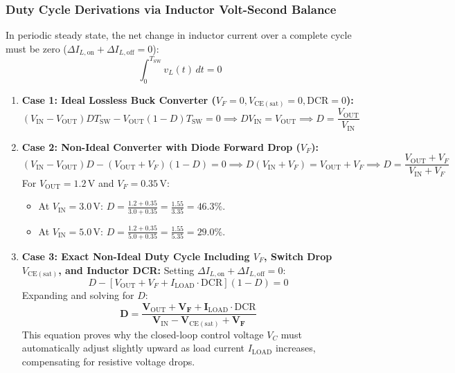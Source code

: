 \documentclass[11pt,a4paper]{article}
\begin{document}
\subsubsection{Duty Cycle Derivations via Inductor Volt-Second Balance}
In periodic steady state, the net change in inductor current over a complete cycle must be zero ($\Delta I_{L,\mathrm{on}} + \Delta I_{L,\mathrm{off}} = 0$):
\begin{equation}
    \int_0^{T_{\mathrm{SW}}} v_L(t)\,dt = 0
\end{equation}
\begin{enumerate}
    \item \textbf{Case 1: Ideal Lossless Buck Converter ($V_F = 0, V_{\mathrm{CE(sat)}} = 0, \mathrm{DCR} = 0$):}
    \begin{equation}
        (V_{\mathrm{IN}} - V_{\mathrm{OUT}}) D T_{\mathrm{SW}} - V_{\mathrm{OUT}} (1 - D) T_{\mathrm{SW}} = 0 \implies D V_{\mathrm{IN}} = V_{\mathrm{OUT}} \implies D = \frac{V_{\mathrm{OUT}}}{V_{\mathrm{IN}}}
    \end{equation}
    \item \textbf{Case 2: Non-Ideal Converter with Diode Forward Drop ($V_F$):}
    \begin{equation}
        (V_{\mathrm{IN}} - V_{\mathrm{OUT}}) D - (V_{\mathrm{OUT}} + V_F)(1 - D) = 0 \implies D(V_{\mathrm{IN}} + V_F) = V_{\mathrm{OUT}} + V_F \implies D = \frac{V_{\mathrm{OUT}} + V_F}{V_{\mathrm{IN}} + V_F}
    \end{equation}
    For $V_{\mathrm{OUT}} = 1.2\,\mathrm{V}$ and $V_F = 0.35\,\mathrm{V}$:
    \begin{itemize}
        \item At $V_{\mathrm{IN}} = 3.0\,\mathrm{V}$: $D = \frac{1.2 + 0.35}{3.0 + 0.35} = \frac{1.55}{3.35} = \mathbf{46.3\%}$.
        \item At $V_{\mathrm{IN}} = 5.0\,\mathrm{V}$: $D = \frac{1.2 + 0.35}{5.0 + 0.35} = \frac{1.55}{5.35} = \mathbf{29.0\%}$.
    \end{itemize}
    \item \textbf{Case 3: Exact Non-Ideal Duty Cycle Including $V_F$, Switch Drop $V_{\mathrm{CE(sat)}}$, and Inductor DCR:}
    Setting $\Delta I_{L,\mathrm{on}} + \Delta I_{L,\mathrm{off}} = 0$:
    \begin{equation}
        [V_{\mathrm{IN}} - V_{\mathrm{CE(sat)}} - V_{\mathrm{OUT}} - I_{\mathrm{LOAD}}\cdot \mathrm{DCR}] D - [V_{\mathrm{OUT}} + V_F + I_{\mathrm{LOAD}}\cdot \mathrm{DCR}](1 - D) = 0
    \end{equation}
    Expanding and solving for $D$:
    \begin{equation}
        \mathbf{D = \frac{V_{\mathrm{OUT}} + V_F + I_{\mathrm{LOAD}}\cdot \mathrm{DCR}}{V_{\mathrm{IN}} - V_{\mathrm{CE(sat)}} + V_F}}
        \label{eq:exact_duty}
    \end{equation}
    This equation proves why the closed-loop control voltage $V_C$ must automatically adjust slightly upward as load current $I_{\mathrm{LOAD}}$ increases, compensating for resistive voltage drops.
\end{enumerate}
\end{document}
